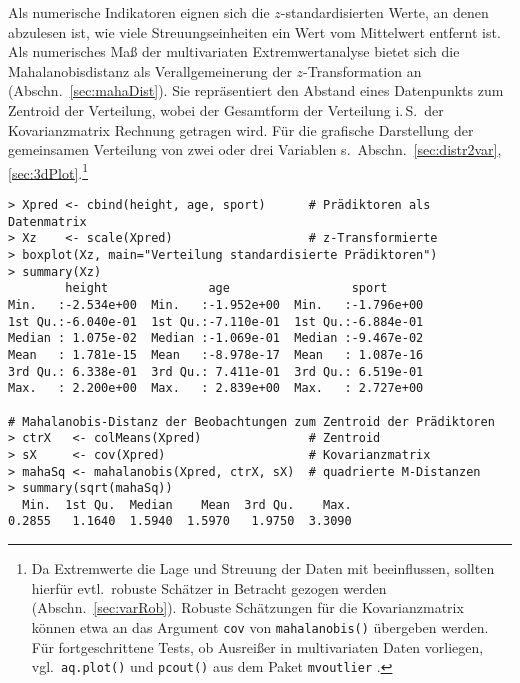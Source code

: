 Als numerische Indikatoren eignen sich die $z$-standardisierten Werte, an denen abzulesen ist, wie viele Streuungseinheiten ein Wert vom Mittelwert entfernt ist. Als numerisches Maß der multivariaten Extremwertanalyse bietet sich die Mahalanobisdistanz als Verallgemeinerung der $z$-Transformation an (Abschn.\ \ref{sec:mahaDist}). Sie repräsentiert den Abstand eines Datenpunkts zum Zentroid der Verteilung, wobei der Gesamtform der Verteilung i.\,S.\ der Kovarianzmatrix Rechnung getragen wird. Für die grafische Darstellung der gemeinsamen Verteilung von zwei oder drei Variablen s.\ Abschn.\ \ref{sec:distr2var}, \ref{sec:3dPlot}.\footnote{Da Extremwerte die Lage und Streuung der Daten mit beeinflussen, sollten hierfür evtl.\ robuste Schätzer in Betracht gezogen werden (Abschn.\ \ref{sec:varRob}). Robuste Schätzungen für die Kovarianzmatrix können etwa an das Argument \lstinline!cov! von \lstinline!mahalanobis()! übergeben werden. Für fortgeschrittene Tests, ob Ausreißer in multivariaten Daten vorliegen, vgl.\ \lstinline!aq.plot()! und \lstinline!pcout()! aus dem Paket \lstinline!mvoutlier! \cite{Filzmoser2011b}.}
\begin{lstlisting}
> Xpred <- cbind(height, age, sport)      # Prädiktoren als Datenmatrix
> Xz    <- scale(Xpred)                   # z-Transformierte
> boxplot(Xz, main="Verteilung standardisierte Prädiktoren")
> summary(Xz)
        height              age                 sport
Min.   :-2.534e+00  Min.   :-1.952e+00  Min.   :-1.796e+00
1st Qu.:-6.040e-01  1st Qu.:-7.110e-01  1st Qu.:-6.884e-01
Median : 1.075e-02  Median :-1.069e-01  Median :-9.467e-02
Mean   : 1.781e-15  Mean   :-8.978e-17  Mean   : 1.087e-16
3rd Qu.: 6.338e-01  3rd Qu.: 7.411e-01  3rd Qu.: 6.519e-01
Max.   : 2.200e+00  Max.   : 2.839e+00  Max.   : 2.727e+00

# Mahalanobis-Distanz der Beobachtungen zum Zentroid der Prädiktoren
> ctrX   <- colMeans(Xpred)               # Zentroid
> sX     <- cov(Xpred)                    # Kovarianzmatrix
> mahaSq <- mahalanobis(Xpred, ctrX, sX)  # quadrierte M-Distanzen
> summary(sqrt(mahaSq))
  Min.  1st Qu.  Median    Mean  3rd Qu.    Max.
0.2855   1.1640  1.5940  1.5970   1.9750  3.3090
\end{lstlisting}

